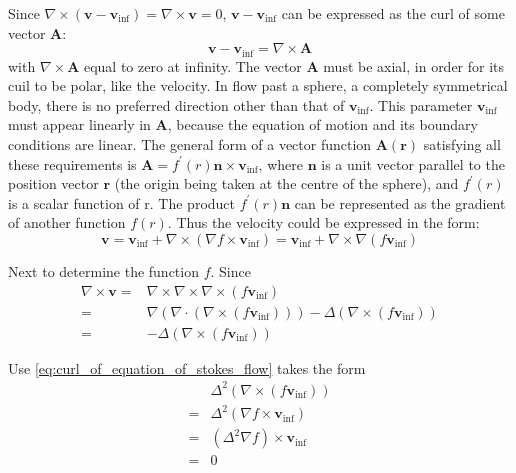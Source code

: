 \documentclass[conference]{IEEEtran}
\theoremstyle{definition}
\theoremstyle{remark}
\begin{document}
    Since $\nabla \times (\mathbf{v} - \mathbf{v}_{\mathrm{inf}}) = \nabla \times \mathbf{v} = 0$, $\mathbf{v} - \mathbf{v}_{\mathrm{inf}}$ can be expressed as the curl of some vector $\mathbf{A}$:
    \begin{equation*}
        \mathbf{v} - \mathbf{v}_{\mathrm{inf}} = \nabla \times \mathbf{A}
    \end{equation*}
    with $\nabla \times \mathbf{A}$ equal to zero at infinity. The vector $\mathbf{A}$ must be axial, in order for its cuil to be polar, like the velocity. In flow past a sphere, a completely symmetrical body, there is no preferred direction other than that of $\mathbf{v}_{\mathrm{inf}}$. This parameter $\mathbf{v}_{\mathrm{inf}}$ must appear linearly in $\mathbf{A}$, because the equation of motion and its boundary conditions are linear. The general form of a vector function $\mathbf{A}(\mathbf{r})$ satisfying all these requirements is $\mathbf{A} = f^\prime (r) \mathbf{n} \times \mathbf{v}_{\mathrm{inf}}$, where $\mathbf{n}$ is a unit vector parallel to the position vector $\mathbf{r}$ (the origin being taken at the centre of the sphere), and $f^\prime(r)$ is a scalar function of r. The product $f^\prime(r) \mathbf{n}$ can be represented as the gradient of another function $f(r)$. Thus the velocity could be expressed in the form:
    \begin{equation}
        \mathbf{v} = \mathbf{v}_{\mathrm{inf}} + \nabla \times (\nabla f \times \mathbf{v}_\mathrm{inf}) = \mathbf{v}_{\mathrm{inf}} + \nabla \times \nabla (f \mathbf{v}_{\mathrm{inf}})
    \end{equation}

    Next to determine the function $f$. Since
    \begin{align*}
        \nabla \times \mathbf{v} =& \nabla \times \nabla \times \nabla \times (f \mathbf{v}_{\mathrm{inf}}) \\
        =& \nabla\left( \nabla \cdot \left( \nabla \times (f\mathbf{v}_\mathrm{inf}) \right) \right) - \Delta (\nabla \times (f \mathbf{v}_\mathrm{inf})) \\
        =& -\Delta (\nabla \times (f\mathbf{v}_\mathrm{inf}))
    \end{align*}

    Use \ref{eq:curl_of_equation_of_stokes_flow} takes the form
    \begin{align*}
        &\Delta^2 (\nabla \times (f\mathbf{v}_\mathrm{inf})) \\
        =& \Delta^2 (\nabla f \times \mathbf{v}_\mathrm{inf}) \\
        =& (\Delta^2 \nabla f) \times \mathbf{v}_\mathrm{inf} \\
        =& 0
    \end{align*}
\end{document}
